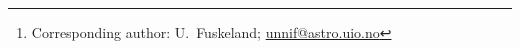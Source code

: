 \newcommand{\oslo}[0]{1}
\newcommand{\iiabangalore}[0]{2}

\author{\small
U.~Fuskeland\inst{\oslo}\thanks{Corresponding author: U.~Fuskeland; \url{unnif@astro.uio.no}}
\and
D.~Watts\inst{\oslo}
et al.
}
